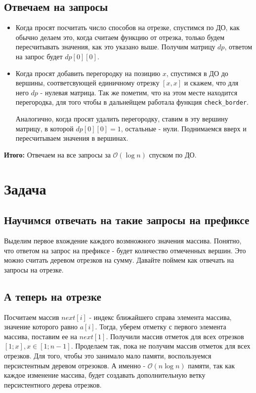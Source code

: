\documentclass{article}
\begin{document}
\subsection*{Отвечаем на запросы}
\begin{itemize}
\item Когда просят посчитать число способов на отрезке, спустимся по ДО, как обычно делаем это, когда считаем функцию от отрезка, только будем пересчитывать значения, как это указано выше. Получим матрицу $dp$, ответом на запрос будет $dp[0][0]$.
\item Когда просят добавить перегородку на позицию $x$, спустимся в ДО до вершины, соответсвующей единичному отрезку $[x, x]$ и скажем, что для него $dp$ - нулевая матрица. Так же пометим, что на этом месте находится перегородка, для того чтобы в дальнейщем работала функция \texttt{check\_border}.

Аналогично, когда просят удалить перегородку, ставим в эту вершину матрицу, в которой $dp[0][0] = 1$, остальные - нули. Поднимаемся вверх и пересчитываем значения в вершинах.
\end{itemize}
\textbf{Итого:}
Отвечаем на все запросы за $\mathcal{O}(\log n)$ спуском по ДО.
\section*{Задача }
\subsection*{Научимся отвечать на такие запросы на префиксе}

Выделим первое вхождение каждого возмножного значения массива. Понятно, что ответом на запрос на префиксе - будет количество отмеченных вершин. Это можно считать деревом отрезков на сумму.
Давайте поймем как отвечать на запросы на отрезке.
\subsection*{А теперь на отрезке}
Посчитаем массив $next[i]$ - индекс ближайшего справа элемента массива, значение которого равно $a[i]$. Тогда, уберем отметку с первого элемента массива, поставим ее на $next[1]$. 
Получили массив отметок для всех отрезков $[1;x], x \in [1;n - 1]$.
Проделаем так, пока не получим массив отметок для всех отрезков.
Для того, чтобы это занимало мало памяти, воспользуемся персистентным деревом отрезоков. А именно - $\mathcal{O}(n \log n)$ памяти, так как каждое изменение массива, будет создавать дополнительную ветку персистентного дерева отрезков.
\end{document}
